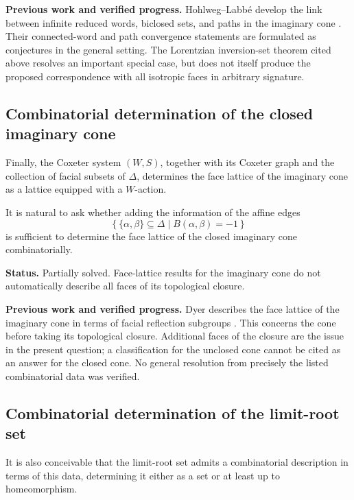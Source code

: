 \documentclass[11pt,reqno]{amsart}
\theoremstyle{plain}
\theoremstyle{definition}
\theoremstyle{remark}
\numberwithin{equation}{section}
\begin{document}
\par\medskip
\noindent\textbf{Previous work and verified progress.}
Hohlweg--Labb\'e develop the link between infinite reduced words,
biclosed sets, and paths in the imaginary cone
\cite[Sections~4.2--4.3]{HL2016}. Their connected-word and path convergence
statements are formulated as conjectures in the general setting.
The Lorentzian inversion-set theorem cited above resolves an important
special case, but does not itself produce the proposed correspondence
with all isotropic faces in arbitrary signature.

\subsection{Combinatorial determination of the closed imaginary cone}

Finally, the Coxeter system $(W,S)$, together with
its Coxeter graph and the collection of facial subsets
of $\Delta$, determines the face lattice of the
imaginary cone as a lattice equipped with a $W$-action.

It is natural to ask whether adding the information
of the affine edges
\[
\left\{
\{\alpha,\beta\}\subseteq\Delta
\mid B(\alpha,\beta)=-1
\right\}
\]
is sufficient to determine the face lattice of the
closed imaginary cone combinatorially.


\par\medskip
\noindent\textbf{Status.} Partially solved. Face-lattice results for the imaginary cone do not automatically describe all faces of its topological closure.

\par\medskip
\noindent\textbf{Previous work and verified progress.}
Dyer describes the face lattice of the imaginary cone in terms of
facial reflection subgroups \cite{Dyer2019}. This concerns the cone
before taking its topological closure. Additional faces of the closure
are the issue in the present question; a classification for the unclosed
cone cannot be cited as an answer for the closed cone. No general
resolution from precisely the listed combinatorial data was verified.

\subsection{Combinatorial determination of the limit-root set}

It is also conceivable that the limit-root set admits
a combinatorial description in terms of this data,
determining it either as a set or at least up to
homeomorphism.
\end{document}

